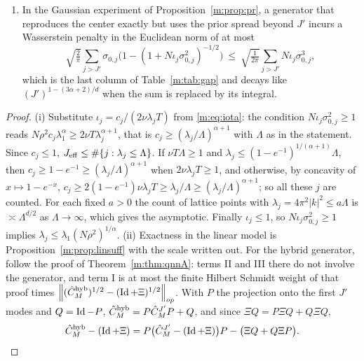 \begin{theorem}
\begin{enumerate}[label=(\roman*),nosep]
\item In the Gaussian experiment of Proposition~\ref{m:prop:pr}, a generator that reproduces the center exactly but uses the prior spread beyond $J'$ incurs a Wasserstein penalty in the Euclidean norm of at most
\[
\sqrt{\tfrac2\pi}\sum_{j>J'}\sigma_{0,j}\Big(1-(1+N\iota_j\sigma_{0,j}^2)^{-1/2}\Big)\ \le\ \sqrt{\tfrac{1}{2\pi}}\sum_{j>J'}N\iota_j\sigma_{0,j}^3 ,
\]
which is the last column of Table~\ref{m:tab:gap} and decays like $(J')^{1-(3\alpha+2)/d}$ when the sum is replaced by its integral.
\end{enumerate}
\end{theorem}

\begin{proof}
(i) Substitute $\iota_j=c_j/(2\nu\lambda_jT)$ from \eqref{m:eq:iota}: the condition $N\iota_j\sigma_{0,j}^2\ge1$ reads $N\rho^2c_j\lambda_1^\alpha\ge2\nu T\lambda_j^{\alpha+1}$, that is $c_j\ge(\lambda_j/\Lambda)^{\alpha+1}$ with $\Lambda$ as in the statement. Since $c_j\le1$, $J_{\rm eff}\le\#\{j:\lambda_j\le\Lambda\}$. If $\nu T\Lambda\ge1$ and $\lambda_j\le(1-e^{-1})^{1/(\alpha+1)}\Lambda$, then $c_j\ge1-e^{-1}\ge(\lambda_j/\Lambda)^{\alpha+1}$ when $2\nu\lambda_jT\ge1$, and otherwise, by concavity of $x\mapsto1-e^{-x}$, $c_j\ge2(1-e^{-1})\nu\lambda_jT\ge\lambda_j/\Lambda\ge(\lambda_j/\Lambda)^{\alpha+1}$; so all these $j$ are counted. For each fixed $a>0$ the count of lattice points with $\lambda_j=4\pi^2|k|^2\le a\Lambda$ is $\asymp\Lambda^{d/2}$ as $\Lambda\to\infty$, which gives the asymptotic. Finally $\iota_j\le1$, so $N\iota_j\sigma_{0,j}^2\ge1$ implies $\lambda_j\le\lambda_1(N\rho^2)^{1/\alpha}$. (ii) Exactness in the linear model is Proposition~\ref{m:prop:linsuff} with the scale written out. For the hybrid generator, follow the proof of Theorem~\ref{m:thm:qnnA}: terms II and III there do not involve the generator, and term I is at most the finite Hilbert Schmidt weight of that proof times $\left\|(\hat C^{\rm hyb}_M)^{1/2}-(\operatorname{Id}+\Xi)^{1/2}\right\|_{op}$. With $P$ the projection onto the first $J'$ modes and $Q=\operatorname{Id}-P$, $\hat C^{\rm hyb}_M=P\hat C^{J'}_MP+Q$, and since $\Xi Q=P\Xi Q+Q\Xi Q$,
\[
\hat C^{\rm hyb}_M-(\operatorname{Id}+\Xi)=P\big(\hat C^{J'}_M-(\operatorname{Id}+\Xi)\big)P-\big(\Xi Q+Q\Xi P\big) .
\]

\end{proof}
